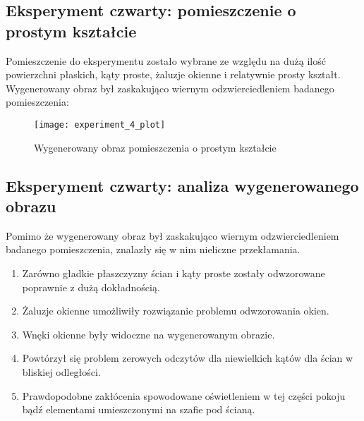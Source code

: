 \newpage
\subsection {Eksperyment czwarty: pomieszczenie o prostym kształcie}
Pomieszczenie do eksperymentu zostało wybrane ze względu na dużą ilość powierzchni płaskich, kąty proste, żaluzje okienne i relatywnie prosty kształt.\\

Wygenerowany obraz był zaskakująco wiernym odzwierciedleniem badanego pomieszczenia:
\begin{figure}[h]
    \centering
    \texttt{[image: experiment\_4\_plot]}
    \caption{Wygenerowany obraz pomieszczenia o prostym kształcie}
    \label{fig:experiment_4_plot}
\end{figure}

\subsection {Eksperyment czwarty: analiza wygenerowanego obrazu}
Pomimo że wygenerowany obraz był zaskakująco wiernym odzwierciedleniem badanego pomieszczenia, znalazły się w nim nieliczne przekłamania.

\begin{enumerate}
    \item Zarówno gładkie płaszczyzny ścian i kąty proste zostały odwzorowane poprawnie z dużą dokładnością.
    \item Żaluzje okienne umożliwiły rozwiązanie problemu odwzorowania okien.
    \item Wnęki okienne były widoczne na wygenerowanym obrazie.
    \item Powtórzył się problem zerowych odczytów dla niewielkich kątów dla ścian w bliskiej odległości.
    \item Prawdopodobne zakłócenia spowodowane oświetleniem w tej części pokoju bądź elementami umieszczonymi na szafie pod ścianą.
\end{enumerate}
